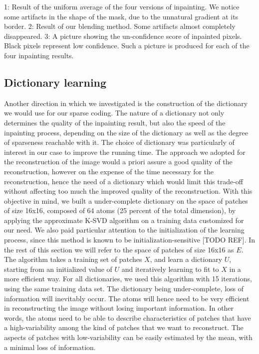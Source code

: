 1: Result of the uniform average of the four versions of inpainting. We notice some artifacts in the shape of the mask, due to the unnatural gradient at its border.
2: Result of our blending method. Some artifacts almost completely disappeared.
3: A picture showing the un-confidence score of inpainted pixels. Black pixels represent low confidence. Such a picture is produced for each of the four inpainting results.

\subsection{Dictionary learning}

Another direction in which we investigated is the construction of the dictionary we would use for our sparse coding. The nature of a dictionary not only determines the quality of the inpainting result, but also the speed of the inpainting process, depending on the size of the dictionary as well as the degree of sparseness reachable with it. 
The choice of dictionary was particularly of interest in our case to improve the running time. The approach we adopted for the reconstruction of the image would a priori assure a good quality of the reconstruction, however on the expense of the time necessary for the reconstruction, hence the need of a dictionary which would limit this trade-off without affecting too much the improved quality of the reconstruction.
With this objective in mind, we built a under-complete dictionary on the space of patches of size 16x16, composed of 64 atoms (25 percent of the total dimension), by applying the approximate K-SVD algorithm on a training data customized for our need. We also paid particular attention to the initialization of the learning process, since this method is known to be initialization-sensitive [TODO REF]. In the rest of this section we will refer to the space of patches of size 16x16 as $E$.
The algorithm takes a training set of patches $X$, and learn a dictionary $U$, starting from an initialized value of $U$ and iteratively learning to fit to $X$ in a more efficient way. 
For all dictionaries, we used this algorithm with 15 iterations, using the same training data set.
The dictionary being under-complete, loss of information will inevitably occur. The atoms will hence need to be very efficient in reconstructing the image without losing important information. In other words, the atoms need to be able to describe characteristics of patches that have a high-variability among the kind of patches that we want to reconstruct. The aspects of patches with low-variability can be easily estimated by the mean, with a minimal loss of information. 
